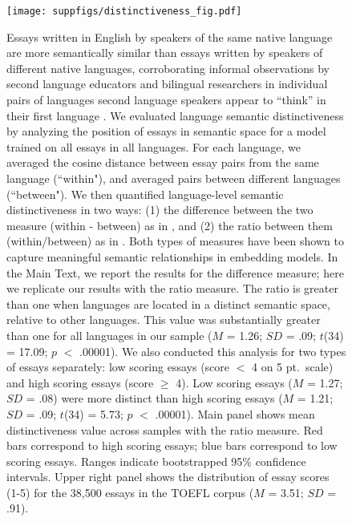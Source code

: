 \documentclass[9pt,twoside,lineno]{pnas-new}
\begin{document}
\pagebreak
\clearpage



\begin{figure}[h]
\centering
\texttt{[image: suppfigs/distinctiveness\_fig.pdf]}


  \caption{Essays written in English by speakers of the same native language are more semantically similar than essays written by speakers of different native languages, corroborating informal observations by second language educators and bilingual researchers in individual pairs of languages second language speakers appear to ``think'' in their first language \cite{wu2014influence, filipovic2018speaking}. We evaluated language semantic distinctiveness by analyzing the position of essays in semantic space for a model trained on all essays in all languages. For each language, we averaged the cosine distance between essay pairs from the same language (``within"), and averaged  pairs between different languages (``between").  We then quantified language-level semantic distinctiveness in two ways: (1) the difference between the two measure (within - between) as in \cite{kozlowski2019geometry, bodell2019interpretable, an2018semaxis, kwak2020frameaxis}, and (2) the ratio between them (within/between) as in \cite{levy2014linguistic, levy2014neural, levy2015improving}. Both types of measures have been shown to capture meaningful semantic relationships in embedding models. In the Main Text, we report the results for the difference measure; here we replicate our results with the ratio measure. The ratio is greater than one when languages are located in a distinct semantic space, relative to other languages. This value was substantially greater than one for all languages in our sample ($M$ = 1.26; $SD$ = .09; $t$(34) = 17.09; $p$ $<$ .00001). We also conducted  this analysis for two types of essays separately: low scoring essays (score $<$ 4 on 5 pt.\ scale) and high scoring essays (score $\geq$ 4).  Low scoring essays ($M$ = 1.27; $SD$ = .08) were more distinct than high scoring essays ($M$ = 1.21; $SD$ = .09; $t$(34) = 5.73; $p$ $<$ .00001).  Main panel shows mean distinctiveness value across samples with the ratio measure.  Red bars correspond to high scoring essays; blue bars correspond to low scoring essays. Ranges indicate bootstrapped 95\% confidence intervals. Upper right panel shows the distribution of essay scores (1-5) for the 38,500 essays in the TOEFL corpus ($M$ = 3.51; $SD$ = .91).}
\end{figure}
\end{document}
